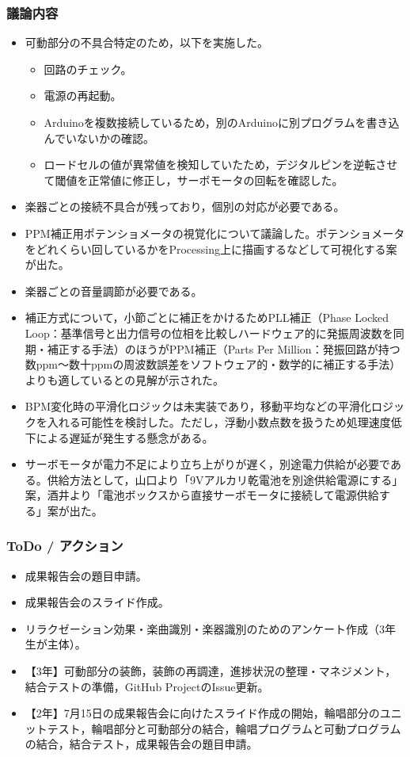 \documentclass[a4paper,12pt]{ltjsarticle}
\begin{document}
\subsubsection*{議論内容}
\begin{itemize}[leftmargin=1.5em]
  \item 可動部分の不具合特定のため，以下を実施した。
  \begin{itemize}
    \item 回路のチェック。
    \item 電源の再起動。
    \item Arduinoを複数接続しているため，別のArduinoに別プログラムを書き込んでいないかの確認。
    \item ロードセルの値が異常値を検知していたため，デジタルピンを逆転させて閾値を正常値に修正し，サーボモータの回転を確認した。
  \end{itemize}
  \item 楽器ごとの接続不具合が残っており，個別の対応が必要である。
  \item PPM補正用ポテンショメータの視覚化について議論した。ポテンショメータをどれくらい回しているかをProcessing上に描画するなどして可視化する案が出た。
  \item 楽器ごとの音量調節が必要である。
  \item 補正方式について，小節ごとに補正をかけるためPLL補正（Phase Locked Loop：基準信号と出力信号の位相を比較しハードウェア的に発振周波数を同期・補正する手法）のほうがPPM補正（Parts Per Million：発振回路が持つ数ppm〜数十ppmの周波数誤差をソフトウェア的・数学的に補正する手法）よりも適しているとの見解が示された。
  \item BPM変化時の平滑化ロジックは未実装であり，移動平均などの平滑化ロジックを入れる可能性を検討した。ただし，浮動小数点数を扱うため処理速度低下による遅延が発生する懸念がある。
  \item サーボモータが電力不足により立ち上がりが遅く，別途電力供給が必要である。供給方法として，山口より「9Vアルカリ乾電池を別途供給電源にする」案，酒井より「電池ボックスから直接サーボモータに接続して電源供給する」案が出た。
\end{itemize}

\subsubsection*{ToDo / アクション}
\begin{itemize}[leftmargin=1.5em]
  \item 成果報告会の題目申請。
  \item 成果報告会のスライド作成。
  \item リラクゼーション効果・楽曲識別・楽器識別のためのアンケート作成（3年生が主体）。
  \item 【3年】可動部分の装飾，装飾の再調達，進捗状況の整理・マネジメント，結合テストの準備，GitHub ProjectのIssue更新。
  \item 【2年】7月15日の成果報告会に向けたスライド作成の開始，輪唱部分のユニットテスト，輪唱部分と可動部分の結合，輪唱プログラムと可動プログラムの結合，結合テスト，成果報告会の題目申請。
\end{itemize}
\end{document}
